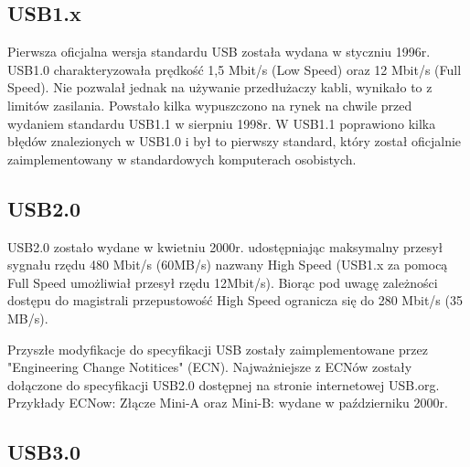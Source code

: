 \documentclass{BscUS}
\begin{document}
\subsection{USB1.x}
Pierwsza oficjalna wersja standardu USB została wydana w styczniu 1996r. USB1.0 charakteryzowała prędkość 1,5 Mbit/s (Low Speed) oraz 12 Mbit/s (Full Speed). Nie pozwalał jednak na używanie przedłużaczy kabli, wynikało to z limitów zasilania. Powstało kilka wypuszczono na rynek na chwile przed wydaniem standardu USB1.1 w sierpniu 1998r. W USB1.1 poprawiono kilka błędów znalezionych w USB1.0 i był to pierwszy standard, który został oficjalnie zaimplementowany w standardowych komputerach osobistych.
\subsection{USB2.0}
USB2.0 zostało wydane w kwietniu 2000r. udostępniając maksymalny przesył sygnału rzędu 480 Mbit/s (60MB/s) nazwany High Speed (USB1.x za pomocą Full Speed umożliwiał przesył rzędu 12Mbit/s). Biorąc pod uwagę zależności dostępu do magistrali przepustowość High Speed ogranicza się do 280 Mbit/s (35 MB/s).


Przyszłe modyfikacje do specyfikacji USB zostały zaimplementowane przez "Engineering Change Notitices" (ECN). Najważniejsze z ECNów zostały dołączone do specyfikacji USB2.0 dostępnej na stronie internetowej USB.org.
\newline
Przykłady ECNow:
\newline
Złącze Mini-A oraz Mini-B: wydane w październiku 2000r.
\newline


\subsection{USB3.0}
\end{document}
